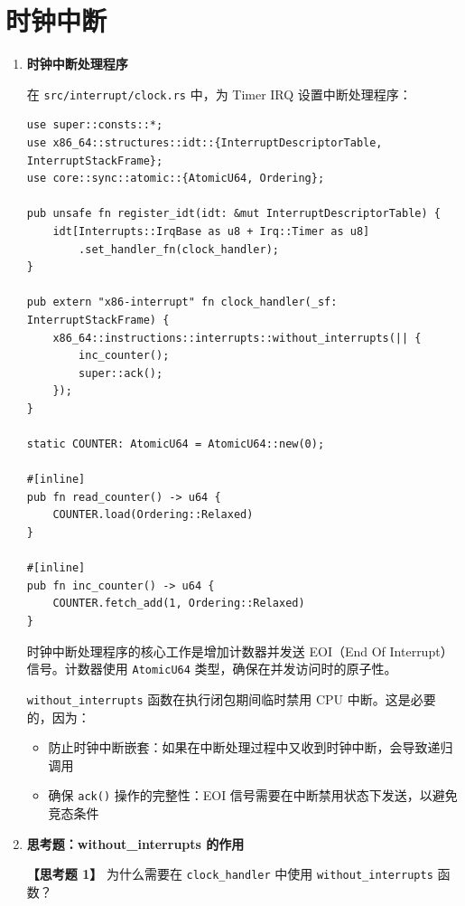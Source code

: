 \documentclass{SYSUReport}
\begin{document}
\section{时钟中断}

\begin{enumerate}[label={\chinese*、},labelsep=0pt, start=6]

    \item \textbf{时钟中断处理程序}

    在 \texttt{src/interrupt/clock.rs} 中，为 Timer IRQ 设置中断处理程序：

    \begin{verbatim}
use super::consts::*;
use x86_64::structures::idt::{InterruptDescriptorTable, InterruptStackFrame};
use core::sync::atomic::{AtomicU64, Ordering};

pub unsafe fn register_idt(idt: &mut InterruptDescriptorTable) {
    idt[Interrupts::IrqBase as u8 + Irq::Timer as u8]
        .set_handler_fn(clock_handler);
}

pub extern "x86-interrupt" fn clock_handler(_sf: InterruptStackFrame) {
    x86_64::instructions::interrupts::without_interrupts(|| {
        inc_counter();
        super::ack();
    });
}

static COUNTER: AtomicU64 = AtomicU64::new(0);

#[inline]
pub fn read_counter() -> u64 {
    COUNTER.load(Ordering::Relaxed)
}

#[inline]
pub fn inc_counter() -> u64 {
    COUNTER.fetch_add(1, Ordering::Relaxed)
}
    \end{verbatim}

    时钟中断处理程序的核心工作是增加计数器并发送 EOI（End Of Interrupt）信号。计数器使用 \texttt{AtomicU64} 类型，确保在并发访问时的原子性。

    \texttt{without\_interrupts} 函数在执行闭包期间临时禁用 CPU 中断。这是必要的，因为：
    \begin{itemize}
        \item 防止时钟中断嵌套：如果在中断处理过程中又收到时钟中断，会导致递归调用
        \item 确保 \texttt{ack()} 操作的完整性：EOI 信号需要在中断禁用状态下发送，以避免竞态条件
    \end{itemize}

    \item \textbf{思考题：without\_interrupts 的作用}

    \textbf{【思考题 1】} 为什么需要在 \texttt{clock\_handler} 中使用 \texttt{without\_interrupts} 函数？


\end{enumerate}
\end{document}
